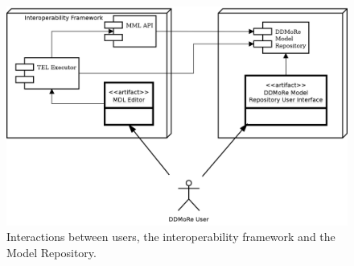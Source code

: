 \begin{figure}[htb]
\centering
\includegraphics{img/UserInteraction}
\caption{Interactions between users, the interoperability framework and the Model Repository.}
\label{fig:userInteraction}
\end{figure}


